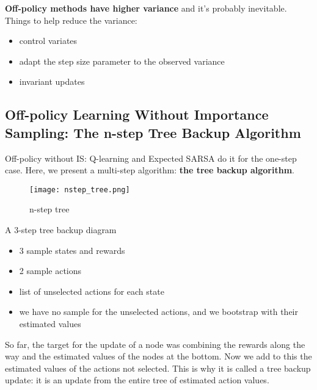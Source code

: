 \documentclass[sutton_barto_notes.tex]{subfiles}
\begin{document}
\textbf{Off-policy methods have higher variance} and it's probably inevitable. Things to help reduce the variance:
\begin{itemize}
\item control variates
\item adapt the step size parameter to the observed variance
\item invariant updates
\end{itemize}

\subsection{Off-policy Learning Without Importance Sampling: The n-step Tree Backup Algorithm}

Off-policy without IS: Q-learning and Expected SARSA do it for the one-step case. Here, we present a multi-step algorithm: \textbf{the tree backup algorithm}.

\begin{figure}[h!]
     \texttt{[image: nstep\_tree.png]}
    \caption{ n-step tree }
\end{figure}
A 3-step tree backup diagram
\begin{itemize}
\item 3 sample states and rewards
\item 2 sample actions
\item list of unselected actions for each state
\item we have no sample for the unselected actions, and we bootstrap with their estimated values
\end{itemize}

So far, the target for the update of a node was combining the rewards along the way and the estimated values of the nodes at the bottom. Now we add to this the estimated values of the actions not selected. This is why it is called a tree backup update: it is an update from the entire tree of estimated action values.
\end{document}
